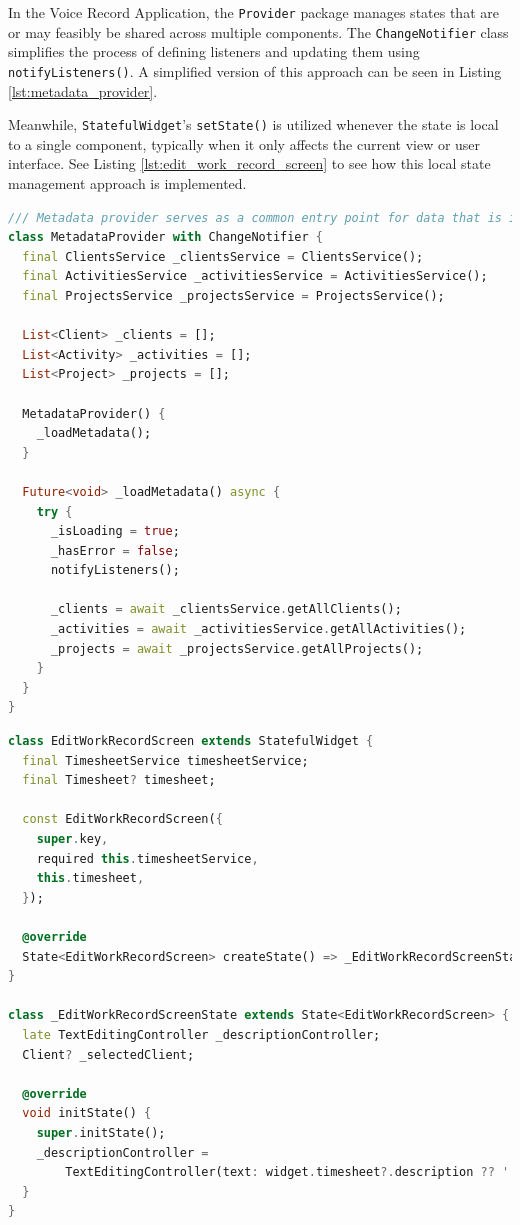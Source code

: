 \documentclass[
  digital,     %
  oneside,     %
  nosansbold,  %
  nocolorbold, %
  lof,         %
  lot,         %
]{fithesis4}
\begin{document}
In the Voice Record Application, the \texttt{Provider} package manages states that are or may feasibly be shared across multiple components. The \texttt{ChangeNotifier} class simplifies the process of defining listeners and updating them using \texttt{notifyListeners()}. A simplified version of this approach can be seen in Listing \ref{lst:metadata_provider}.

Meanwhile, \texttt{StatefulWidget}'s \texttt{setState()} is utilized whenever the state is local to a single component, typically when it only affects the current view or user interface. See Listing \ref{lst:edit_work_record_screen} to see how this local state management approach is implemented.

\newpage
\begin{lstlisting}[language=Dart, caption={Provider example for \texttt{MetadataProvider} class}, label={lst:metadata_provider}, floatplacement=H, showstringspaces=false]
/// Metadata provider serves as a common entry point for data that is identical to all work records
class MetadataProvider with ChangeNotifier {
  final ClientsService _clientsService = ClientsService();
  final ActivitiesService _activitiesService = ActivitiesService();
  final ProjectsService _projectsService = ProjectsService();

  List<Client> _clients = [];
  List<Activity> _activities = [];
  List<Project> _projects = [];

  MetadataProvider() {
    _loadMetadata();
  }

  Future<void> _loadMetadata() async {
    try {
      _isLoading = true;
      _hasError = false;
      notifyListeners();

      _clients = await _clientsService.getAllClients();
      _activities = await _activitiesService.getAllActivities();
      _projects = await _projectsService.getAllProjects();
    }
  }
}
\end{lstlisting}

\newpage
\begin{lstlisting}[language=Dart, caption={Stateful example on \texttt{EditWorkRecordScreen} Widget class}, label={lst:edit_work_record_screen}, floatplacement=H, showstringspaces=false]
class EditWorkRecordScreen extends StatefulWidget {
  final TimesheetService timesheetService;
  final Timesheet? timesheet;

  const EditWorkRecordScreen({
    super.key,
    required this.timesheetService,
    this.timesheet,
  });

  @override
  State<EditWorkRecordScreen> createState() => _EditWorkRecordScreenState();
}

class _EditWorkRecordScreenState extends State<EditWorkRecordScreen> {
  late TextEditingController _descriptionController;
  Client? _selectedClient;

  @override
  void initState() {
    super.initState();
    _descriptionController =
        TextEditingController(text: widget.timesheet?.description ?? '');
  }
}
\end{lstlisting}
\end{document}
